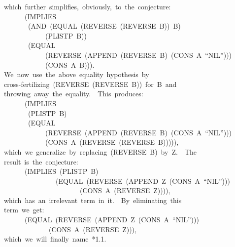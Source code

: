 \documentclass[11pt]{book}
\newenvironment{pubasis}{\begin{flushleft}\ttfamily\small}{\normalsize\rmfamily\end{flushleft}}
\begin{document}
\begin{pubasis}
~~which~further~simplifies,~obviously,~to~the~conjecture:\\

~~~~~~~~(IMPLIES\\
~~~~~~~~~(AND~(EQUAL~(REVERSE~(REVERSE~B))~B)\\
~~~~~~~~~~~~~~(PLISTP~B))\\
~~~~~~~~~(EQUAL\\
~~~~~~~~~~~~~~(REVERSE~(APPEND~(REVERSE~B)~(CONS~A~``NIL'')))\\
~~~~~~~~~~~~~~(CONS~A~B))).\\

~~We~now~use~the~above~equality~hypothesis~by\\
~~cross-fertilizing~(REVERSE~(REVERSE~B))~for~B~and\\
~~throwing~away~the~equality.~~This~produces:\\

~~~~~~~~(IMPLIES\\
~~~~~~~~~(PLISTP~B)\\
~~~~~~~~~(EQUAL\\
~~~~~~~~~~~~~~(REVERSE~(APPEND~(REVERSE~B)~(CONS~A~``NIL'')))\\
~~~~~~~~~~~~~~(CONS~A~(REVERSE~(REVERSE~B))))),\\

~~which~we~generalize~by~replacing~(REVERSE~B)~by~Z.~~The\\
~~result~is~the~conjecture:\\

~~~~~~~~(IMPLIES~(PLISTP~B)\\
~~~~~~~~~~~~~~~~~(EQUAL~(REVERSE~(APPEND~Z~(CONS~A~``NIL'')))\\
~~~~~~~~~~~~~~~~~~~~~~~~(CONS~A~(REVERSE~Z)))),\\

~~which~has~an~irrelevant~term~in~it.~~By~eliminating~this\\
~~term~we~get:\\

~~~~~~~~(EQUAL~(REVERSE~(APPEND~Z~(CONS~A~``NIL'')))\\
~~~~~~~~~~~~~~~(CONS~A~(REVERSE~Z))),\\

~~which~we~will~finally~name~*1.1.\\


\end{pubasis}
\end{document}
